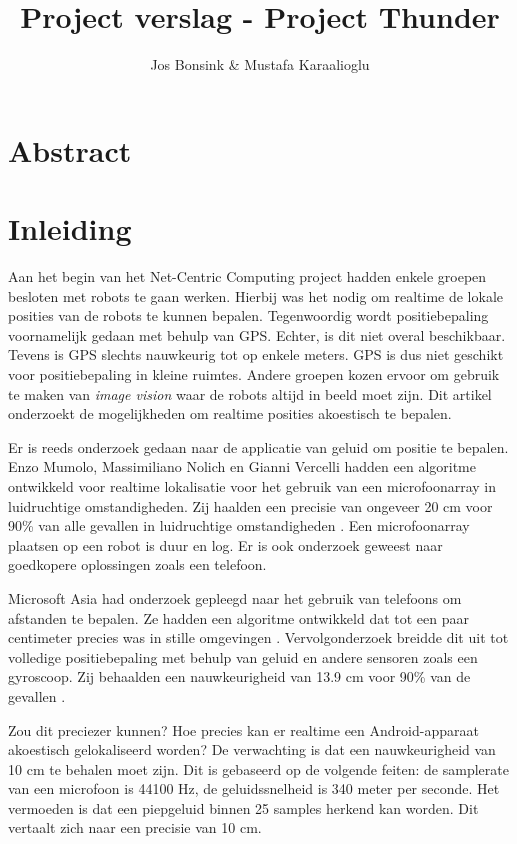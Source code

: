 \documentclass[12pt]{article}
\author{Jos Bonsink \& Mustafa Karaalioglu}
\begin{document}
\title{Project verslag - Project Thunder}
\maketitle

\section{Abstract}

\section{Inleiding}
Aan het begin van het Net-Centric Computing project hadden enkele groepen besloten met robots te gaan werken. Hierbij was het nodig om realtime de lokale posities van de robots te kunnen bepalen. Tegenwoordig wordt positiebepaling voornamelijk gedaan met behulp van GPS. Echter, is dit niet overal beschikbaar. Tevens is GPS slechts nauwkeurig tot op enkele meters. GPS is dus niet geschikt voor positiebepaling in kleine ruimtes. Andere groepen kozen ervoor om gebruik te maken van \textit{image vision} waar de robots altijd in beeld moet zijn. Dit artikel onderzoekt de mogelijkheden om realtime \cite{stankovic1988misconceptions} posities akoestisch te bepalen.

Er is reeds onderzoek gedaan naar de applicatie van geluid om positie te bepalen. Enzo Mumolo, Massimiliano Nolich en Gianni Vercelli hadden een algoritme ontwikkeld voor realtime lokalisatie voor het gebruik van een microfoonarray in luidruchtige omstandigheden. Zij haalden een precisie van ongeveer 20 cm voor 90\% van alle gevallen in luidruchtige omstandigheden \cite{mumolo2003algorithms}. Een microfoonarray plaatsen op een robot is duur en log. Er is ook onderzoek geweest naar goedkopere oplossingen zoals een telefoon. 

Microsoft Asia had onderzoek gepleegd naar het gebruik van telefoons om afstanden te bepalen. Ze hadden een algoritme ontwikkeld dat tot een paar centimeter precies was in stille omgevingen \cite{peng2007beepbeep}. Vervolgonderzoek breidde dit uit tot volledige positiebepaling met behulp van geluid en andere sensoren zoals een gyroscoop. Zij behaalden een nauwkeurigheid van 13.9 cm voor 90\% van de gevallen \cite{qiu2011feasibility}.

Zou dit preciezer kunnen? Hoe precies kan er realtime een Android-apparaat akoestisch gelokaliseerd worden? De verwachting is dat een nauwkeurigheid van 10 cm te behalen moet zijn. Dit is gebaseerd op de volgende feiten: de samplerate van een microfoon is 44100 Hz, de geluidssnelheid is 340 meter per seconde. Het vermoeden is dat een piepgeluid binnen 25 samples herkend kan worden. Dit vertaalt zich naar een precisie van 10 cm.
\end{document}
